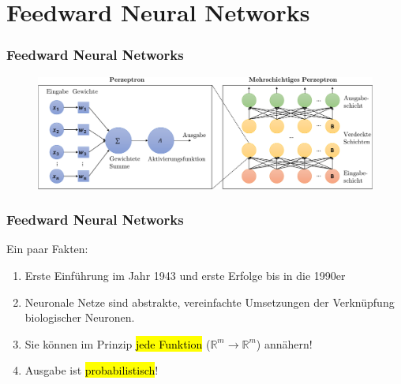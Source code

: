 \documentclass[german,aspectratio=169]{beamer}
\begin{document}
\section{Feedward Neural Networks}
\begin{frame}
	\frametitle{Feedward Neural Networks}
	\begin{figure}
	\includegraphics[width=1.0\textwidth]{perzeptron.pdf}
\end{figure}
\end{frame}

\begin{frame}
	\frametitle{Feedward Neural Networks}
	Ein paar Fakten:
	\begin{enumerate}[label=$\bullet$]
		\item Erste Einführung im Jahr 1943 und erste Erfolge bis in die 1990er
		\item Neuronale Netze sind abstrakte, vereinfachte Umsetzungen der Verknüpfung biologischer Neuronen.
		\item Sie können im Prinzip \hl{jede Funktion} ($\mathbb{R}^m \rightarrow \mathbb{R}^m$) annähern!
		\item Ausgabe ist \hl{probabilistisch}!
	\end{enumerate}
\end{frame}

\end{document}

